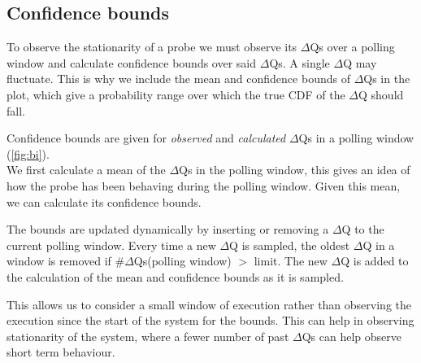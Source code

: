 \subsection{Confidence bounds}
    To observe the stationarity of a probe we must observe its $\Delta$Qs over a polling window and calculate confidence bounds over said $\Delta$Qs. A single $\Delta$Q may fluctuate. This is why we include the mean and confidence bounds of $\Delta$Qs in the plot, which give a probability range over which the true CDF of the $\Delta$Q should fall. \cite{conf-b}

    Confidence bounds are given for \textit{observed} and \textit{calculated} $\Delta$Qs in a polling window (\cref{fig:bi}). \\
    We first calculate a mean of the $\Delta$Qs in the polling window, this gives an idea of how the probe has been behaving during the polling window. Given this mean, we can calculate its confidence bounds.

    The bounds are updated dynamically by inserting or removing a $\Delta$Q to the current polling window. Every time a new $\Delta$Q is sampled, the oldest $\Delta$Q in a window is removed if \#$\Delta$Qs(polling window) $>$ limit. The new $\Delta$Q is added to the calculation of the mean and confidence bounds as it is sampled. 

    This allows us to consider a small window of execution rather than observing the execution since the start of the system for the bounds. This can help in observing stationarity of the system, where a fewer number of past $\Delta$Qs can help observe short term behaviour.

